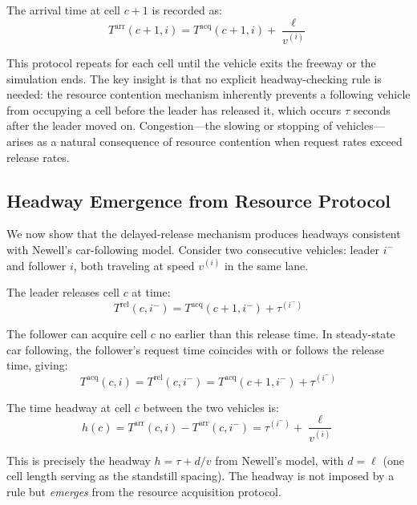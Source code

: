 \documentclass[review,authoryear]{elsarticle}
\newcommand{\Tacq}{T^{\text{acq}}}
\newcommand{\Tarr}{T^{\text{arr}}}
\newcommand{\Trel}{T^{\text{rel}}}
\begin{document}
The arrival time at cell $c+1$ is recorded as:
\begin{equation}
    \Tarr(c+1, i) = \Tacq(c+1, i) + \frac{\ell}{v^{(i)}}
    \label{eq:arrival}
\end{equation}

This protocol repeats for each cell until the vehicle exits the freeway or the simulation ends. The key insight is that no explicit headway-checking rule is needed: the resource contention mechanism inherently prevents a following vehicle from occupying a cell before the leader has released it, which occurs $\tau$ seconds after the leader moved on. Congestion---the slowing or stopping of vehicles---arises as a natural consequence of resource contention when request rates exceed release rates.

\subsection{Headway Emergence from Resource Protocol}
\label{sec:headway}

We now show that the delayed-release mechanism produces headways consistent with Newell's car-following model. Consider two consecutive vehicles: leader $i^{-}$ and follower $i$, both traveling at speed $v^{(i)}$ in the same lane.

The leader releases cell $c$ at time:
\begin{equation}
    \Trel(c, i^{-}) = \Tacq(c+1, i^{-}) + \tau^{(i^{-})}
\end{equation}

The follower can acquire cell $c$ no earlier than this release time. In steady-state car following, the follower's request time coincides with or follows the release time, giving:
\begin{equation}
    \Tacq(c, i) = \Trel(c, i^{-}) = \Tacq(c+1, i^{-}) + \tau^{(i^{-})}
\end{equation}

The time headway at cell $c$ between the two vehicles is:
\begin{equation}
    h(c) = \Tarr(c, i) - \Tarr(c, i^{-}) = \tau^{(i^{-})} + \frac{\ell}{v^{(i)}}
    \label{eq:headway}
\end{equation}

This is precisely the headway $h = \tau + d/v$ from Newell's model, with $d = \ell$ (one cell length serving as the standstill spacing). The headway is not imposed by a rule but \emph{emerges} from the resource acquisition protocol.
\end{document}
